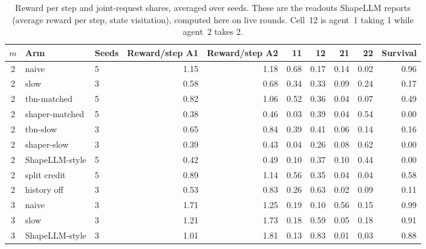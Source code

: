 \begin{table}[ht]
\centering\small
\caption{Reward per step and joint-request shares, averaged over seeds. These are the readouts ShapeLLM reports (average reward per step, state visitation), computed here on live rounds. Cell~12 is agent~1 taking 1 while agent~2 takes 2.}
\label{tab:currency}
\begin{tabular}{cllrrrrrrr}
\toprule
$m$ & Arm & Seeds & Reward/step A1 & Reward/step A2 & 11 & 12 & 21 & 22 & Survival \\
\midrule
2 & naive & 5 & 1.15 & 1.18 & 0.68 & 0.17 & 0.14 & 0.02 & 0.96 \\
2 & slow & 3 & 0.58 & 0.68 & 0.34 & 0.33 & 0.09 & 0.24 & 0.17 \\
2 & tbn-matched & 5 & 0.82 & 1.06 & 0.52 & 0.36 & 0.04 & 0.07 & 0.49 \\
2 & shaper-matched & 5 & 0.38 & 0.46 & 0.03 & 0.39 & 0.04 & 0.54 & 0.00 \\
2 & tbn-slow & 3 & 0.65 & 0.84 & 0.39 & 0.41 & 0.06 & 0.14 & 0.16 \\
2 & shaper-slow & 3 & 0.39 & 0.43 & 0.04 & 0.26 & 0.08 & 0.62 & 0.00 \\
2 & ShapeLLM-style & 5 & 0.42 & 0.49 & 0.10 & 0.37 & 0.10 & 0.44 & 0.00 \\
2 & split credit & 5 & 0.89 & 1.14 & 0.56 & 0.35 & 0.04 & 0.04 & 0.58 \\
2 & history off & 3 & 0.53 & 0.83 & 0.26 & 0.63 & 0.02 & 0.09 & 0.11 \\
3 & naive & 3 & 1.71 & 1.25 & 0.19 & 0.10 & 0.56 & 0.15 & 0.99 \\
3 & slow & 3 & 1.21 & 1.73 & 0.18 & 0.59 & 0.05 & 0.18 & 0.91 \\
3 & ShapeLLM-style & 3 & 1.01 & 1.81 & 0.13 & 0.83 & 0.01 & 0.03 & 0.88 \\
\bottomrule
\end{tabular}
\end{table}
